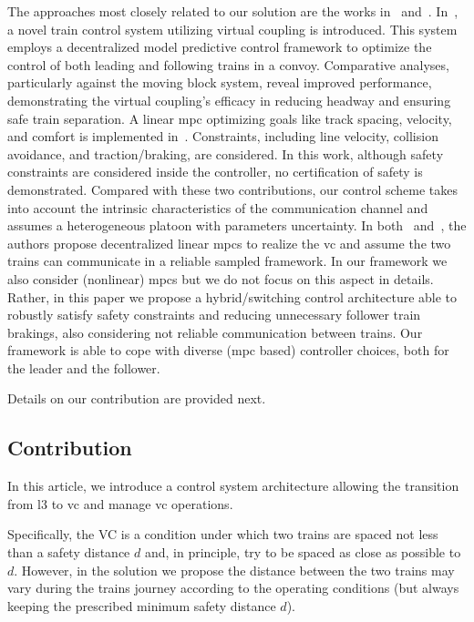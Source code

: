 \documentclass[letterpaper, 10 pt, conference]{ieeeconf}
\theoremstyle{definition}
\theoremstyle{nopoint}
\begin{document}
The approaches most closely related to our solution are the works in~\cite{felez2019model} and~\cite{wu2021virtually}. In~\cite{felez2019model}, a novel train control system utilizing virtual coupling is introduced. This system employs a decentralized model predictive control framework to optimize the control of both leading and following trains in a convoy. Comparative analyses, particularly against the moving block system, reveal improved performance, demonstrating the virtual coupling's efficacy in reducing headway and ensuring safe train separation. A linear \gls{mpc} optimizing goals like track spacing, velocity, and comfort is implemented in~\cite{wu2021virtually}. Constraints, including line velocity, collision avoidance, and traction/braking, are considered. In this work, although  safety constraints are considered inside the controller, no certification of safety is demonstrated. Compared with these two contributions, our control scheme takes into account the intrinsic characteristics of the communication channel and assumes a heterogeneous platoon with parameters uncertainty. In both~\cite{felez2019model} and~\cite{wu2021virtually}, the authors propose decentralized linear \glspl{mpc} to realize the \gls{vc} and assume the two trains can communicate in a reliable sampled framework.
In our framework we also consider (nonlinear) \glspl{mpc} but we do not focus on this aspect in details. 
Rather, in this paper we propose a hybrid/switching control architecture able to robustly satisfy safety constraints and reducing unnecessary follower train brakings, also considering not reliable communication between trains. Our framework is able to cope with diverse (\gls{mpc} based) controller choices, both for the leader and the follower. 

Details on our contribution are provided next.


\subsection{Contribution}
\label{subsec:contribution}
%

In this article, we introduce a control system architecture
allowing the transition from \gls{l3} to \gls{vc} and manage \gls{vc} operations. 

Specifically, the VC is a condition under which two trains are spaced not less than a safety distance $d$ and, in principle, try to be spaced as close as possible to $d$. 
However, in the solution we propose the distance between the two trains may vary during the trains journey according to the operating conditions (but always keeping the prescribed minimum safety distance $d$).
\end{document}
